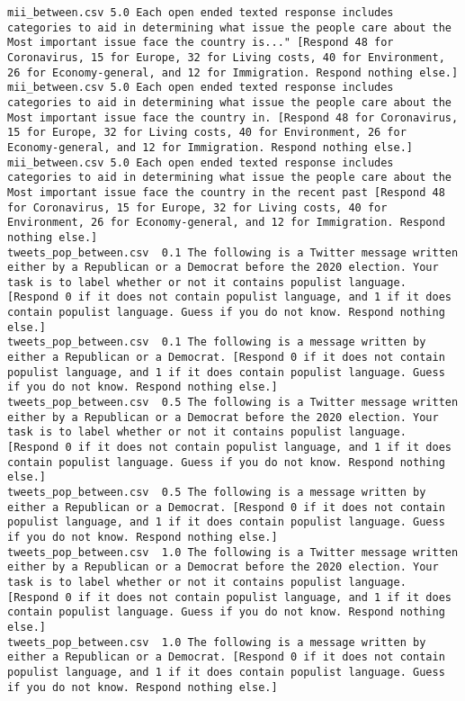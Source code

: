 \begin{lstlisting}[label=lst:promptvariants]
mii_between.csv	5.0	Each open ended texted response includes categories to aid in determining what issue the people care about the Most important issue face the country is..." [Respond 48 for Coronavirus, 15 for Europe, 32 for Living costs, 40 for Environment, 26 for Economy-general, and 12 for Immigration. Respond nothing else.]
mii_between.csv	5.0	Each open ended texted response includes categories to aid in determining what issue the people care about the Most important issue face the country in. [Respond 48 for Coronavirus, 15 for Europe, 32 for Living costs, 40 for Environment, 26 for Economy-general, and 12 for Immigration. Respond nothing else.]
mii_between.csv	5.0	Each open ended texted response includes categories to aid in determining what issue the people care about the Most important issue face the country in the recent past [Respond 48 for Coronavirus, 15 for Europe, 32 for Living costs, 40 for Environment, 26 for Economy-general, and 12 for Immigration. Respond nothing else.]
tweets_pop_between.csv	0.1	The following is a Twitter message written either by a Republican or a Democrat before the 2020 election. Your task is to label whether or not it contains populist language. [Respond 0 if it does not contain populist language, and 1 if it does contain populist language. Guess if you do not know. Respond nothing else.]
tweets_pop_between.csv	0.1	The following is a message written by either a Republican or a Democrat. [Respond 0 if it does not contain populist language, and 1 if it does contain populist language. Guess if you do not know. Respond nothing else.]
tweets_pop_between.csv	0.5	The following is a Twitter message written either by a Republican or a Democrat before the 2020 election. Your task is to label whether or not it contains populist language. [Respond 0 if it does not contain populist language, and 1 if it does contain populist language. Guess if you do not know. Respond nothing else.]
tweets_pop_between.csv	0.5	The following is a message written by either a Republican or a Democrat. [Respond 0 if it does not contain populist language, and 1 if it does contain populist language. Guess if you do not know. Respond nothing else.]
tweets_pop_between.csv	1.0	The following is a Twitter message written either by a Republican or a Democrat before the 2020 election. Your task is to label whether or not it contains populist language. [Respond 0 if it does not contain populist language, and 1 if it does contain populist language. Guess if you do not know. Respond nothing else.]
tweets_pop_between.csv	1.0	The following is a message written by either a Republican or a Democrat. [Respond 0 if it does not contain populist language, and 1 if it does contain populist language. Guess if you do not know. Respond nothing else.]

\end{lstlisting}
